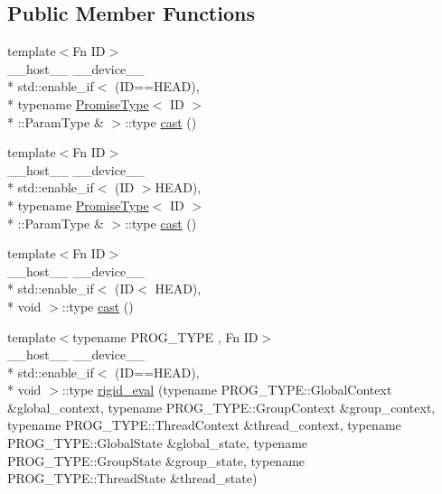 \subsection*{Public Member Functions}
\begin{DoxyCompactItemize}
\item 
{\footnotesize template$<$Fn I\-D$>$ }\\\-\_\-\-\_\-host\-\_\-\-\_\- \-\_\-\-\_\-device\-\_\-\-\_\- \\*
std\-::enable\-\_\-if$<$ (I\-D==H\-E\-A\-D), \\*
typename \hyperlink{structPromiseType}{Promise\-Type}$<$ I\-D $>$\\*
\-::Param\-Type \& $>$\-::type \hyperlink{unionPromiseUnion_3_01HEAD_00_01TAIL_8_8_8_4_aa5cc967e362d0902fb20d586a4a9852b}{cast} ()
\item 
{\footnotesize template$<$Fn I\-D$>$ }\\\-\_\-\-\_\-host\-\_\-\-\_\- \-\_\-\-\_\-device\-\_\-\-\_\- \\*
std\-::enable\-\_\-if$<$ (I\-D $>$H\-E\-A\-D), \\*
typename \hyperlink{structPromiseType}{Promise\-Type}$<$ I\-D $>$\\*
\-::Param\-Type \& $>$\-::type \hyperlink{unionPromiseUnion_3_01HEAD_00_01TAIL_8_8_8_4_add5a8e6138823156a6b1929522cee154}{cast} ()
\item 
{\footnotesize template$<$Fn I\-D$>$ }\\\-\_\-\-\_\-host\-\_\-\-\_\- \-\_\-\-\_\-device\-\_\-\-\_\- \\*
std\-::enable\-\_\-if$<$ (I\-D$<$ H\-E\-A\-D), \\*
void $>$\-::type \hyperlink{unionPromiseUnion_3_01HEAD_00_01TAIL_8_8_8_4_a7f78b66884ac72d59476de7efe9fc221}{cast} ()
\item 
{\footnotesize template$<$typename P\-R\-O\-G\-\_\-\-T\-Y\-P\-E , Fn I\-D$>$ }\\\-\_\-\-\_\-host\-\_\-\-\_\- \-\_\-\-\_\-device\-\_\-\-\_\- \\*
std\-::enable\-\_\-if$<$ (I\-D==H\-E\-A\-D), \\*
void $>$\-::type \hyperlink{unionPromiseUnion_3_01HEAD_00_01TAIL_8_8_8_4_ac70fca73e52ab153566959cb7320008f}{rigid\-\_\-eval} (typename P\-R\-O\-G\-\_\-\-T\-Y\-P\-E\-::\-Global\-Context \&global\-\_\-context, typename P\-R\-O\-G\-\_\-\-T\-Y\-P\-E\-::\-Group\-Context \&group\-\_\-context, typename P\-R\-O\-G\-\_\-\-T\-Y\-P\-E\-::\-Thread\-Context \&thread\-\_\-context, typename P\-R\-O\-G\-\_\-\-T\-Y\-P\-E\-::\-Global\-State \&global\-\_\-state, typename P\-R\-O\-G\-\_\-\-T\-Y\-P\-E\-::\-Group\-State \&group\-\_\-state, typename P\-R\-O\-G\-\_\-\-T\-Y\-P\-E\-::\-Thread\-State \&thread\-\_\-state)

\end{DoxyCompactItemize}
